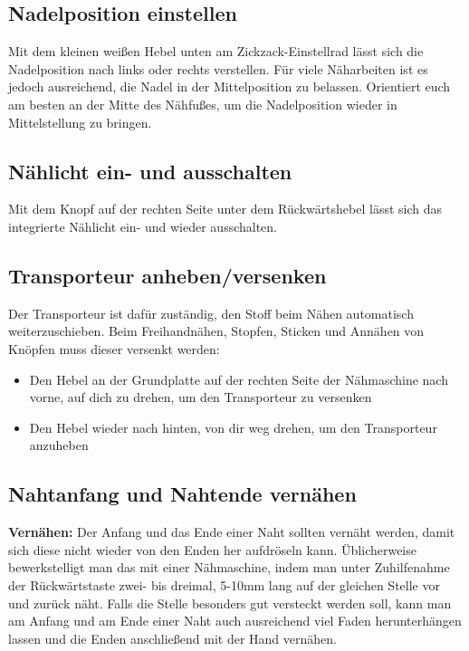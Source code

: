\documentclass{\basedir/fablab-document}
\begin{document}
\subsection{Nadelposition einstellen}
Mit dem kleinen weißen Hebel unten am Zickzack-Einstellrad lässt sich die Nadelposition nach links oder rechts verstellen.
Für viele Näharbeiten ist es jedoch ausreichend, die Nadel in der Mittelposition zu belassen.
Orientiert euch am besten an der Mitte des Nähfußes, um die Nadelposition wieder in Mittelstellung zu bringen.

\subsection{Nählicht ein- und ausschalten}
Mit dem Knopf auf der rechten Seite unter dem Rückwärtshebel lässt sich das integrierte Nählicht ein- und wieder ausschalten.

\subsection{Transporteur anheben/versenken}
Der Transporteur ist dafür zuständig, den Stoff beim Nähen automatisch weiterzuschieben.
\newline Beim Freihandnähen, Stopfen, Sticken und Annähen von Knöpfen muss dieser versenkt werden:
\begin{itemize}
	\item Den Hebel an der Grundplatte auf der rechten Seite der Nähmaschine nach vorne, auf dich zu drehen, um den Transporteur zu versenken
	\item Den Hebel wieder nach hinten, von dir weg drehen, um den Transporteur anzuheben
\end{itemize}

\subsection{Nahtanfang und Nahtende vernähen}\label{sec:vernaehen}
\textbf{Vernähen:}
\newline
Der Anfang und das Ende einer Naht sollten vernäht werden, damit sich diese nicht wieder von den Enden her aufdröseln kann.
Üblicherweise bewerkstelligt man das mit einer Nähmaschine, indem man unter Zuhilfenahme der Rückwärtstaste zwei- bis dreimal, 5-10mm lang auf der gleichen Stelle vor und zurück näht.
Falls die Stelle besonders gut versteckt werden soll, kann man am Anfang und am Ende einer Naht auch ausreichend viel Faden herunterhängen lassen und die Enden anschließend mit der Hand vernähen.
\end{document}
